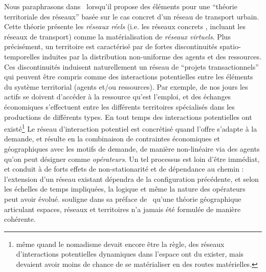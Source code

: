 {}{
Nous paraphrasons  dans~\cite{dupuy1987vers} lorsqu'il propose des éléments pour une ``théorie territoriale des réseaux'' basée sur le cas concret d'un réseau de transport urbain. Cette théorie présente les \emph{réseaux réels} (i.e. les réseaux concrets %
, incluant les réseaux de transport) comme la matérialisation de \emph{réseaux virtuels}. 
 Plus précisément, un territoire est caractérisé par de fortes discontinuités spatio-temporelles induites par la distribution non-uniforme des agents 
  et des ressources. Ces discontinuités induisent naturellement un réseau de ``projets transactionnels'' 
 qui peuvent être compris comme des interactions potentielles entre les éléments du système territorial %
(agents et/ou ressources). Par exemple, de nos jours les actifs se doivent d'accéder à la ressource qu'est l'emploi, et des échanges économiques s'effectuent entre les différents territoires spécialisés dans les productions de différents types. En tout temps des interactions potentielles ont existé\footnote{même quand le nomadisme devait encore être la règle, des réseaux d'interactions potentielles dynamiques dans l'espace ont du exister, mais devaient avoir moins de chance de se matérialiser en des routes matérielles.} Le réseau d'interaction potentiel est concrétisé quand l'offre s'adapte à la demande, et résulte en la combinaison de contraintes économiques et géographiques avec les motifs de demande, de manière non-linéaire via des agents qu'on peut désigner comme \emph{opérateurs}. Un tel processus est loin d'être immédiat, et conduit à de forts effets de non-stationarité et de dépendance au chemin  
 : l'extension d'un réseau existant dépendra de la configuration précédente, et selon les échelles de temps impliquées, la logique et même la nature des opérateurs peut avoir évolué.  souligne dans sa préface de~\cite{offner1996reseaux} qu'une théorie géographique articulant espaces, réseaux et territoires n'a jamais été formulée de manière cohérente. 
}
